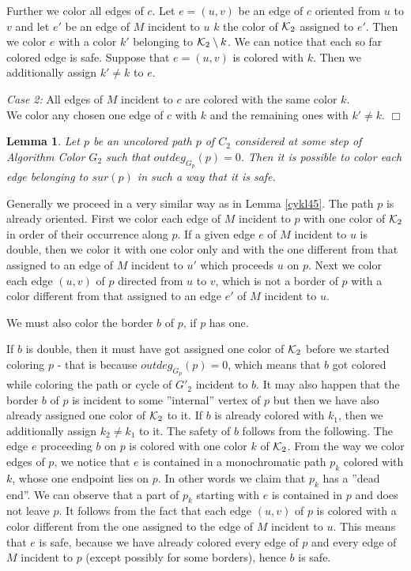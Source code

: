 \documentclass[a4, 11pt]{article}
\newcommand{\dowod}{\noindent{\bf Proof.~}}
\newcommand{\koniec}{\hfill $\Box$\\[.1ex]}
\newcommand{\<}{\langle}
\renewcommand{\>}{\rangle}
\newcommand{\Kd}{{\cal K}_2}
\newtheorem{lemma}{Lemma}
\begin{document}
Further we color all edges of $c$. Let $e=(u,v)$ be an edge of $c$ oriented from $u$ to $v$ and let $e'$ be an edge of $M$ incident to $u$
$k$ the color of $\Kd$ assigned to $e'$. Then we color $e$ with a color $k'$ belonging to $\Kd \setminus k$. We can notice that each so far colored edge is safe. Suppose that $e=(u,v)$ is colored with $k$. Then we additionally assign $k'\neq k$ to $e$. 


{\em Case 2:} All edges of $M$ incident to $c$ are colored with the same color $k$. \\
We color any chosen one edge of $c$ with $k$ and the remaining ones with $k' \neq k$.  \koniec


\begin{lemma}\label{path45}
Let $p$ be an  uncolored path $p$ of $C_2$ considered at some step of Algorithm Color $G_2$ such that $outdeg_{G_p}(p)=0$. Then it is possible to color each edge belonging to $sur(p)$ in such a way that it is safe.
\end{lemma}

\dowod 
Generally  we proceed in a very similar way as in Lemma \ref{cykl45}. The path $p$ is already oriented.  First we color each edge  of $M$ incident to $p$ with one color of $\Kd$ in order of their occurrence along $p$. If a given edge $e$ of $M$ incident to $u$ is double, then  we color it with one color only and with the one different from that assigned to an edge of $M$ incident to $u'$ which proceeds $u$ on $p$. Next we color each edge $(u,v)$ of $p$ directed from $u$ to $v$, which is not a border of $p$ with a color different from that assigned to an edge $e'$ of $M$ incident to $u$. 

We must also color the border $b$ of $p$, if $p$ has one. 

If $b$ is double, then it must have got assigned one color of $\Kd$ before we started coloring $p$ - that is because $outdeg_{G_p}(p)=0$, which means that $b$ got colored while coloring the path or cycle of $G'_2$ incident to $b$. It may also happen that the border $b$ of $p$ is incident to some ''internal'' vertex of $p$ but then we have also already assigned one color of $\Kd$ to it. If $b$ is already colored with $k_1$,  then we additionally assign $k_2\neq k_1$ to it. 
The safety of $b$ follows from the following. The edge $e$ proceeding $b$ on $p$ is colored with one color $k$ of $\Kd$. From the way we color edges of $p$, we notice that $e$ is contained in a monochromatic path $p_k$ colored with $k$, whose one endpoint lies on $p$. In other words we claim that $p_k$ has a ''dead end''. We can observe  that a part of $p_k$ starting with $e$ is contained in $p$ and does not leave $p$. It follows from the fact that  each edge $(u,v)$ of $p$ is colored with a color different from the one assigned to the edge of $M$ incident to $u$. This means that $e$ is safe, because we have already colored every edge of $p$ and every edge of $M$ incident to $p$ (except possibly for some borders), hence $b$ is safe.
\end{document}
